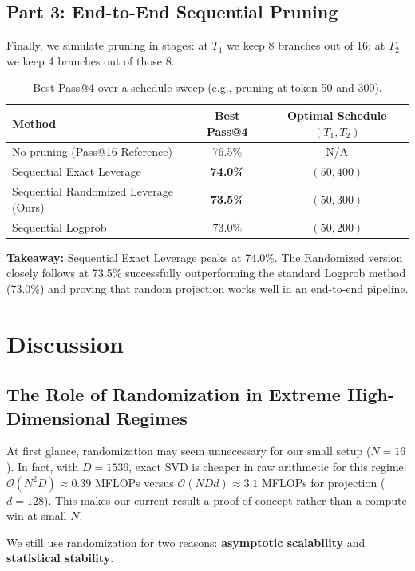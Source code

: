 \documentclass[11pt]{article}
\begin{document}
\subsection{Part 3: End-to-End Sequential Pruning}

Finally, we simulate pruning in stages: at $T_1$ we keep 8 branches out of 16; at $T_2$ we keep 4 branches out of those 8. 

\begin{table}[H]
\centering
\caption{Best Pass@4 over a schedule sweep (e.g., pruning at token 50 and 300).}
\label{tab:endtoend-accuracy}
\begin{tabular}{lcc}
\toprule
\textbf{Method} & \textbf{Best Pass@4} & \textbf{Optimal Schedule $(T_1,T_2)$} \\
\midrule
No pruning (Pass@16 Reference) & 76.5\% & N/A \\
\midrule
Sequential Exact Leverage & \textbf{74.0\%} & $(50,400)$ \\
Sequential Randomized Leverage (Ours) & \textbf{73.5\%} & $(50,300)$ \\
Sequential Logprob & 73.0\% & $(50,200)$  \\
\bottomrule
\end{tabular}
\end{table}

\textbf{Takeaway:} Sequential Exact Leverage peaks at 74.0\%. The Randomized version closely follows at 73.5\%
 successfully outperforming the standard Logprob method (73.0\%) and proving that random projection works well
 in an end-to-end pipeline.

\section{Discussion}

\subsection{The Role of Randomization in Extreme High-Dimensional Regimes}
At first glance, randomization may seem unnecessary for our small setup ($N=16$). In fact, with $D=1536$, exact SVD is cheaper in raw arithmetic for this regime: $\mathcal{O}(N^2 D) \approx 0.39$ MFLOPs versus $\mathcal{O}(NDd) \approx 3.1$ MFLOPs for projection ($d=128$). This makes our current result a proof-of-concept rather than a compute win at small $N$.

We still use randomization for two reasons: \textbf{asymptotic scalability} and \textbf{statistical stability}.
\end{document}
